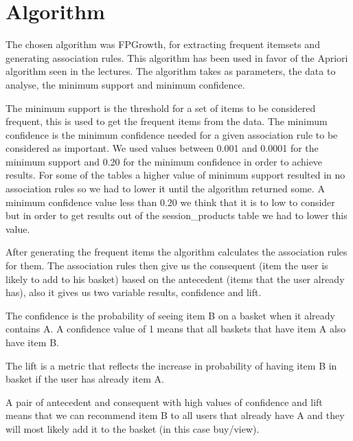 \section{Algorithm}
\label{algorithm}

The chosen algorithm was FPGrowth, for extracting frequent itemsets and generating association rules.
This algorithm has been used in favor of the Apriori algorithm seen in the lectures.
The algorithm takes as parameters, the data to analyse, the minimum support and minimum confidence. 

The minimum support is the threshold for a set of items to be considered frequent, 
this is used to get the frequent items from the data.
The minimum confidence is the minimum confidence needed for a given association rule to be considered as important.
We used values between 0.001 and 0.0001 for the minimum support and 0.20 for the minimum confidence in order to achieve results.
For some of the tables a higher value of minimum support resulted in no association rules so we had to lower it until the algorithm returned some.
A minimum confidence value less than 0.20 we think that it is to low to consider but in order to get results out of the session\_products table we had to lower this value.

After generating the frequent items the algorithm calculates the association rules for them.
The association rules then give us the consequent (item the user is likely to add to his basket) based on
the antecedent (items that the user already has), also it gives us two variable results, confidence and lift.

The confidence is the probability of seeing item B on a basket when it already contains A. A confidence value of 1
means that all baskets that have item A also have item B.

The lift is a metric that reflects the increase in probability of having item B in basket if the user has already
item A.

A pair of antecedent and consequent with high values of confidence and lift means that we can recommend item B to all
users that already have A and they will most likely add it to the basket (in this case buy/view). 